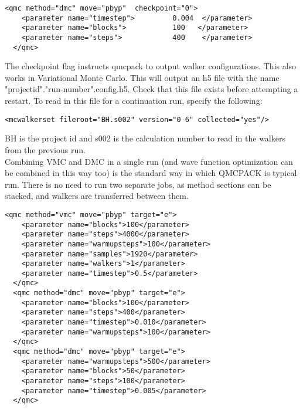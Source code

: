\begin{lstlisting}[caption=The following is an example of running a simulation that can be restarted . ]
  <qmc method="dmc" move="pbyp"  checkpoint="0">
    <parameter name="timestep">         0.004  </parameter>
    <parameter name="blocks">           100   </parameter>
    <parameter name="steps">            400    </parameter>
  </qmc>
\end{lstlisting}
The checkpoint flag instructs qmcpack to output walker configurations.  This also
works in Variational Monte Carlo.  This will output an h5 file with the name "projectid"."run-number".config.h5.
Check that this file exists before attempting a restart.
To read in this file for a continuation run, specify the following:
\begin{lstlisting}[caption=Restart (read walkers from previous run) ]
 <mcwalkerset fileroot="BH.s002" version="0 6" collected="yes"/>
\end{lstlisting}
BH is the project id and s002 is the calculation number to read in the walkers from the previous run.\\

Combining VMC and DMC in a single run (and wave function optimization can be combined in this way too) is the standard way in which QMCPACK is typical run.   There is no need to run two separate jobs, as method sections can be stacked, and walkers are transferred between them.

\begin{lstlisting}[caption=Combined VMC and DMC run ]
  <qmc method="vmc" move="pbyp" target="e">
    <parameter name="blocks">100</parameter>
    <parameter name="steps">4000</parameter>
    <parameter name="warmupsteps">100</parameter>
    <parameter name="samples">1920</parameter>
    <parameter name="walkers">1</parameter>
    <parameter name="timestep">0.5</parameter>
  </qmc>
  <qmc method="dmc" move="pbyp" target="e">
    <parameter name="blocks">100</parameter>
    <parameter name="steps">400</parameter>
    <parameter name="timestep">0.010</parameter>
    <parameter name="warmupsteps">100</parameter>
  </qmc>
  <qmc method="dmc" move="pbyp" target="e">
    <parameter name="warmupsteps">500</parameter>
    <parameter name="blocks">50</parameter>
    <parameter name="steps">100</parameter>
    <parameter name="timestep">0.005</parameter>
  </qmc>
\end{lstlisting}




